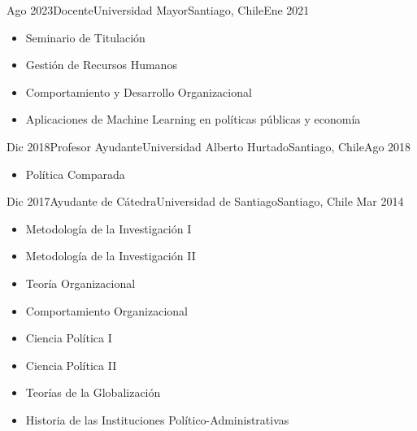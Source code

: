 





\begin{experiences}
  \experience
    {Ago 2023}{Docente}{Universidad Mayor}{Santiago, Chile}{Ene 2021}
    {\begin{itemize}
    \item Seminario de Titulación
    \item Gestión de Recursos Humanos
    \item Comportamiento y Desarrollo Organizacional
    \item Aplicaciones de Machine Learning en políticas públicas y economía
    \end{itemize}}
    {}
\end{experiences}
\vspace{-2mm}

\begin{experiences}
  \experience
    {Dic 2018}{Profesor Ayudante}{Universidad Alberto Hurtado}{Santiago, Chile}{Ago 2018}
    {\begin{itemize}
    \item Política Comparada
    \end{itemize}}
    {}
\end{experiences}
\vspace{-2mm}

\begin{experiences}
  \emptySeparator 
  \experience 
    {Dic 2017}{Ayudante de Cátedra}{Universidad de Santiago}{Santiago, Chile} {Mar 2014}
    {\begin{itemize}
    \item Metodología de la Investigación I
    \item Metodología de la Investigación II
    \item Teoría Organizacional
    \item Comportamiento Organizacional
    \item Ciencia Política I
    \item Ciencia Política II
    \item Teorías de la Globalización
    \item Historia de las Instituciones Político-Administrativas
    \end{itemize}}
    {}
\end{experiences}
\vspace{-2mm}

